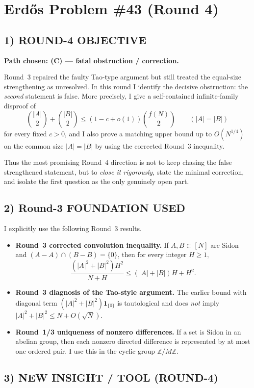 \section{Erd\H{o}s Problem \#43 (Round 4)}

\subsection{1) ROUND-4 OBJECTIVE}

\textbf{Path chosen: (C) --- fatal obstruction / correction.}

Round~3 repaired the faulty Tao-type argument but still treated the equal-size strengthening as unresolved.  In this round I identify the decisive obstruction: the \emph{second} statement is false.  More precisely, I give a self-contained infinite-family disproof of
\[
\binom{|A|}{2}+\binom{|B|}{2}\le (1-c+o(1))\binom{f(N)}{2}
\qquad (|A|=|B|)
\]
for every fixed $c>0$, and I also prove a matching upper bound up to $O(N^{1/4})$ on the common size $|A|=|B|$ by using the corrected Round~3 inequality.

Thus the most promising Round~4 direction is not to keep chasing the false strengthened statement, but to \emph{close it rigorously}, state the minimal correction, and isolate the first question as the only genuinely open part.

\subsection{2) Round-3 FOUNDATION USED}

I explicitly use the following Round~3 results.
\begin{itemize}
\item \textbf{Round~3 corrected convolution inequality.} If $A,B\subset[N]$ are Sidon and $(A-A)\cap(B-B)=\{0\}$, then for every integer $H\ge 1$,
\[
\frac{(|A|^2+|B|^2)H^2}{N+H}\le (|A|+|B|)H+H^2.
\]
\item \textbf{Round~3 diagnosis of the Tao-style argument.} The earlier bound with diagonal term $(|A|^2+|B|^2)\mathbf 1_{\{0\}}$ is tautological and does \emph{not} imply $|A|^2+|B|^2\le N+O(\sqrt N)$.
\item \textbf{Round~1/3 uniqueness of nonzero differences.} If a set is Sidon in an abelian group, then each nonzero directed difference is represented by at most one ordered pair.  I use this in the cyclic group $\mathbb Z/M\mathbb Z$.
\end{itemize}

\subsection{3) NEW INSIGHT / TOOL (ROUND-4)}

